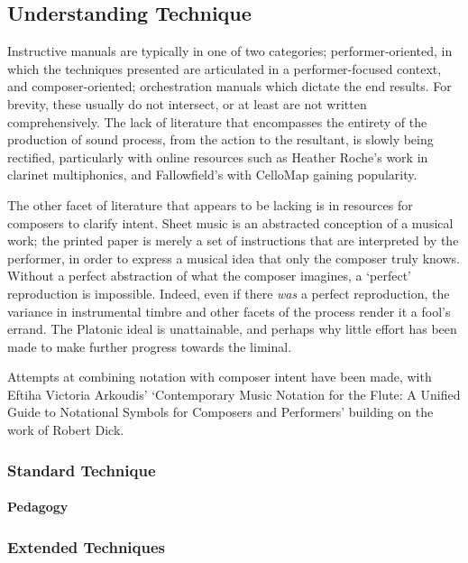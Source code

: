 \subsection{Understanding Technique}

Instructive manuals are typically in one of two categories; performer-oriented, in which the techniques presented are articulated in a performer-focused context, and composer-oriented; orchestration manuals which dictate the end results.
For brevity, these usually do not intersect, or at least are not written comprehensively. 
The lack of literature that encompasses the entirety of the production of sound process, from the action to the resultant, is slowly being rectified, particularly with online resources such as Heather Roche's work in clarinet multiphonics, and Fallowfield's with CelloMap gaining popularity.\autocite{rocheHeatherRoche, fallowfieldCelloMap}

The other facet of literature that appears to be lacking is in resources for composers to clarify intent.
Sheet music is an abstracted conception of a musical work; the printed paper is merely a set of instructions that are interpreted by the performer, in order to express a musical idea that only the composer truly knows.
Without a perfect abstraction of what the composer imagines, a `perfect' reproduction is impossible.
Indeed, even if there \emph{was} a perfect reproduction, the variance in instrumental timbre and other facets of the process render it a fool's errand.
The Platonic ideal is unattainable, and perhaps why little effort has been made to make further progress towards the liminal.\autocite{citation needed}

Attempts at combining notation with composer intent have been made, with Eftiha Victoria Arkoudis' `Contemporary Music Notation for the Flute: A Unified Guide to Notational Symbols for Composers and Performers' building on the work of Robert Dick.\autocite{arkoudisContemporaryMusicNotation2019}

\subsubsection{Standard Technique}



\paragraph{Pedagogy}

\subsubsection{Extended Techniques}


